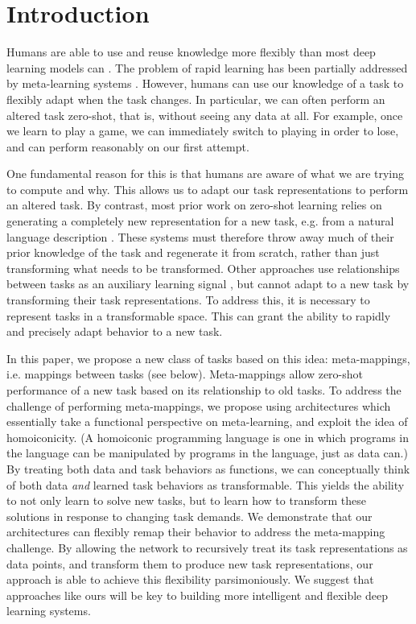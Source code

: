 \documentclass{article}
\begin{document}
\section{Introduction}
\vspace{-0.5em} %
Humans are able to use and reuse knowledge more flexibly than most deep learning models can \citep{Lake2016, Marcus2018}. The problem of rapid learning has been partially addressed by meta-learning systems \citep[see also section \ref{sec_discussion}]{Santoro2016, Finn2017a, Finn2018, Stadie2018, Botvinick2019}. However, humans can use our knowledge of a task to flexibly adapt when the task changes. In particular, we can often perform an altered task zero-shot, that is, without seeing any data at all. For example, once we learn to play a game, we can immediately switch to playing in order to lose, and can perform reasonably on our first attempt. \par
One fundamental reason for this is that humans are aware of what we are trying to compute and why. This allows us to adapt our task representations to perform an altered task. By contrast, most prior work on zero-shot learning relies on generating a completely new representation for a new task, e.g. from a natural language description \citep[e.g.]{Socher2013, Oh2017a}. These systems must therefore throw away much of their prior knowledge of the task and regenerate it from scratch, rather than just transforming what needs to be transformed. Other approaches use relationships between tasks as an auxiliary learning signal \citep[e.g.]{Yao2019, Pal2019}, but cannot adapt to a new task by transforming their task representations. To address this, it is necessary to represent tasks in a transformable space. This can grant the ability to rapidly and precisely adapt behavior to a new task. \par
In this paper, we propose a new class of tasks based on this idea: meta-mappings, i.e. mappings between tasks (see below). Meta-mappings allow zero-shot performance of a new task based on its relationship to old tasks. To address the challenge of performing meta-mappings, we propose using architectures which essentially take a functional perspective on meta-learning, and exploit the idea of homoiconicity. (A homoiconic programming language is one in which programs in the language can be manipulated by programs in the language, just as data can.) By treating both data and task behaviors as functions, we can conceptually think of both data \emph{and} learned task behaviors as transformable. This yields the ability to not only learn to solve new tasks, but to learn how to transform these solutions in response to changing task demands. We demonstrate that our architectures can flexibly remap their behavior to address the meta-mapping challenge. By allowing the network to recursively treat its task representations as data points, and transform them to produce new task representations, our approach is able to achieve this flexibility parsimoniously. We suggest that approaches like ours will be key to building more intelligent and flexible deep learning systems. \par
\end{document}
